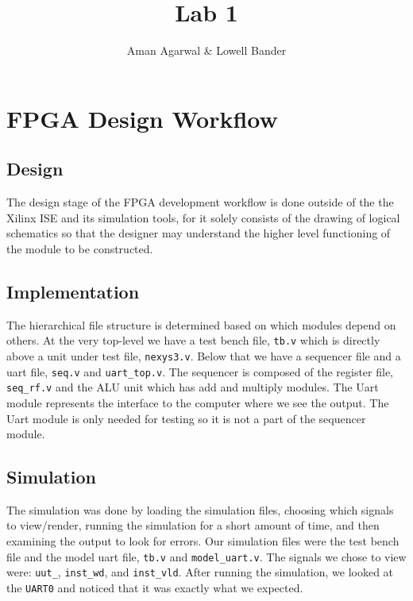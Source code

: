 \documentclass[]{article}
\newcommand{\subtitle}[1]{%
  \posttitle{%
    \par\end{center}
    \begin{center}\large#1\end{center}
    \vskip0.5em}%
}
\begin{document}
\title{Lab 1}
\subtitle{CS M152A}
\author{Aman Agarwal \& Lowell Bander}

\maketitle
\tableofcontents
\newpage

\section{FPGA Design Workflow}


\subsection{Design}

The design stage of the FPGA development workflow is done outside of the the Xilinx ISE and its simulation tools, for it solely consists of the drawing of logical schematics so that the designer may understand the higher level functioning of the module to be constructed.

\subsection{Implementation}

The hierarchical file structure is determined based on which modules depend on others. At the very top-level we have a test bench file, \texttt{tb.v} which is directly above a unit under test file, \texttt{nexys3.v}. Below that we have a sequencer file and a uart file, \texttt{seq.v} and \texttt{uart\_top.v}. The sequencer is composed of the register file, \texttt{seq\_rf.v} and the ALU unit which has add and multiply modules. The Uart module represents the interface to the computer where we see the output. The Uart module is only needed for testing so it is not a part of the sequencer module.

\subsection{Simulation}

The simulation was done by loading the simulation files, choosing which signals to view/render, running the simulation for a short amount of time, and then examining the output to look for errors. Our simulation files were the test bench file and the model uart file, \texttt{tb.v} and \texttt{model\_uart.v}. The signals we chose to view were: \texttt{uut\_}, \texttt{inst\_wd}, and \texttt{inst\_vld}. After running the simulation, we looked at the \texttt{UART0} and noticed that it was exactly what we expected.
\end{document}
